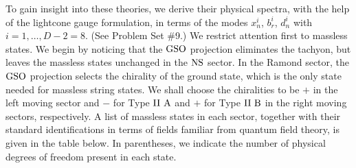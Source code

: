 To gain insight into these theories, we derive their
physical spectra, with the help of the lightcone gauge
formulation, in terms of the modes $x_{n}^i$, $b_{r}^i$,
$d_n^i$ with $i=1,\ldots,D-2=8$.
(See Problem Set \#9.)
We restrict attention first to massless states.
We begin by noticing that the ${\rm GSO}$ projection
eliminates the tachyon, but leaves the massless states
unchanged in the ${\rm NS}$ sector.
In the Ramond sector, the ${\rm GSO}$ projection selects
the chirality of the ground state, which is the only
state needed for massless string states.
We shall choose the chiralities to be $+$ in the left
moving sector and $-$ for Type ${\rm II~A}$ and $+$ for Type
${\rm II~B}$ in the right moving sectors, respectively.
A list of massless states in each sector, together with
their standard identifications in terms of fields
familiar from quantum
field theory, is given in the table below.
In parentheses, we indicate the number of physical
degrees of freedom present in each state.

